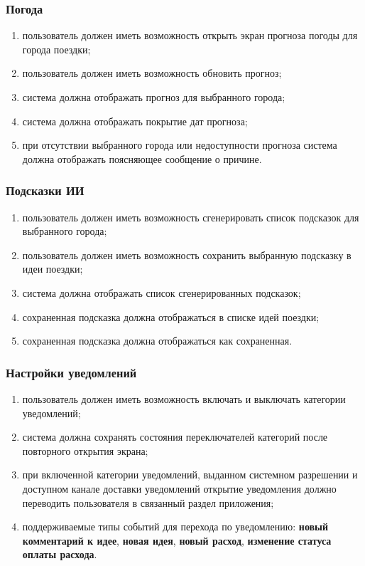 \documentclass[12pt,a4paper]{article}
\begin{document}
\subsubsection{Погода}
\begin{enumerate}
  \item пользователь должен иметь возможность открыть экран прогноза погоды для города поездки;
  \item пользователь должен иметь возможность обновить прогноз;
  \item система должна отображать прогноз для выбранного города;
  \item система должна отображать покрытие дат прогноза;
  \item при отсутствии выбранного города или недоступности прогноза система должна отображать поясняющее сообщение о причине.
\end{enumerate}

\subsubsection{Подсказки ИИ}
\begin{enumerate}
  \item пользователь должен иметь возможность сгенерировать список подсказок для выбранного города;
  \item пользователь должен иметь возможность сохранить выбранную подсказку в идеи поездки;
  \item система должна отображать список сгенерированных подсказок;
  \item сохраненная подсказка должна отображаться в списке идей поездки;
  \item сохраненная подсказка должна отображаться как сохраненная.
\end{enumerate}

\subsubsection{Настройки уведомлений}
\begin{enumerate}
  \item пользователь должен иметь возможность включать и выключать категории уведомлений;
  \item система должна сохранять состояния переключателей категорий после повторного открытия экрана;
  \item при включенной категории уведомлений, выданном системном разрешении и доступном канале доставки уведомлений открытие уведомления должно переводить пользователя в связанный раздел приложения;
  \item поддерживаемые типы событий для перехода по уведомлению: \textbf{новый комментарий к идее}, \textbf{новая идея}, \textbf{новый расход}, \textbf{изменение статуса оплаты расхода}.
\end{enumerate}
\end{document}
